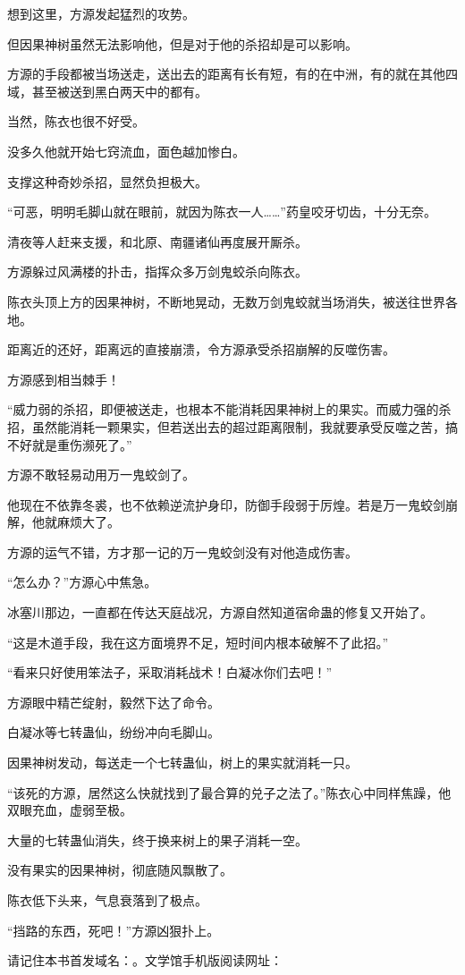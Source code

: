 \begin{this_body}
想到这里，方源发起猛烈的攻势。

但因果神树虽然无法影响他，但是对于他的杀招却是可以影响。

方源的手段都被当场送走，送出去的距离有长有短，有的在中洲，有的就在其他四域，甚至被送到黑白两天中的都有。

当然，陈衣也很不好受。

没多久他就开始七窍流血，面色越加惨白。

支撑这种奇妙杀招，显然负担极大。

“可恶，明明毛脚山就在眼前，就因为陈衣一人……”药皇咬牙切齿，十分无奈。

清夜等人赶来支援，和北原、南疆诸仙再度展开厮杀。

方源躲过风满楼的扑击，指挥众多万剑鬼蛟杀向陈衣。

陈衣头顶上方的因果神树，不断地晃动，无数万剑鬼蛟就当场消失，被送往世界各地。

距离近的还好，距离远的直接崩溃，令方源承受杀招崩解的反噬伤害。

方源感到相当棘手！

“威力弱的杀招，即便被送走，也根本不能消耗因果神树上的果实。而威力强的杀招，虽然能消耗一颗果实，但若送出去的超过距离限制，我就要承受反噬之苦，搞不好就是重伤濒死了。”

方源不敢轻易动用万一鬼蛟剑了。

他现在不依靠冬裘，也不依赖逆流护身印，防御手段弱于厉煌。若是万一鬼蛟剑崩解，他就麻烦大了。

方源的运气不错，方才那一记的万一鬼蛟剑没有对他造成伤害。

“怎么办？”方源心中焦急。

冰塞川那边，一直都在传达天庭战况，方源自然知道宿命蛊的修复又开始了。

“这是木道手段，我在这方面境界不足，短时间内根本破解不了此招。”

“看来只好使用笨法子，采取消耗战术！白凝冰你们去吧！”

方源眼中精芒绽射，毅然下达了命令。

白凝冰等七转蛊仙，纷纷冲向毛脚山。

因果神树发动，每送走一个七转蛊仙，树上的果实就消耗一只。

“该死的方源，居然这么快就找到了最合算的兑子之法了。”陈衣心中同样焦躁，他双眼充血，虚弱至极。

大量的七转蛊仙消失，终于换来树上的果子消耗一空。

没有果实的因果神树，彻底随风飘散了。

陈衣低下头来，气息衰落到了极点。

“挡路的东西，死吧！”方源凶狠扑上。

请记住本书首发域名：。文学馆手机版阅读网址：

\end{this_body}


